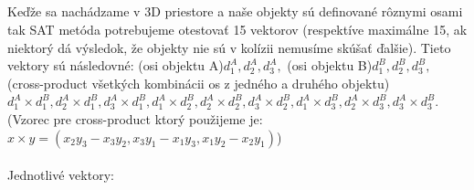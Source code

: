 \documentclass[a4paper]{article}
\begin{document}
	\subsection{}
	Keďže sa nachádzame v 3D priestore a naše objekty sú definované rôznymi osami tak SAT metóda potrebujeme otestovať 15 vektorov (respektíve maximálne 15, ak niektorý dá výsledok, že objekty nie sú v kolízii nemusíme skúšať ďalšie). Tieto vektory sú následovné: (osi objektu A)$d_1^A, d_2^A, d_3^A,$ (osi objektu B)$d_1^B, d_2^B, d_3^B,$ (cross-product všetkých kombinácii os z jedného a druhého objektu)$d_1^A \times d_1^B, d_2^A \times d_1^B, d_3^A \times d_1^B, d_1^A \times d_2^B, d_2^A \times d_2^B, d_3^A \times d_2^B, d_1^A \times d_3^B, d_2^A \times d_3^B, d_3^A \times d_3^B $. (Vzorec pre cross-product ktorý použijeme je: $x \times y = (x_2 y_3 - x_3 y_2, x_3 y_1 - x_1 y_3, x_1 y_2 - x_2 y_1)$)
	\\
	\\
	Jednotlivé vektory:
\end{document}
